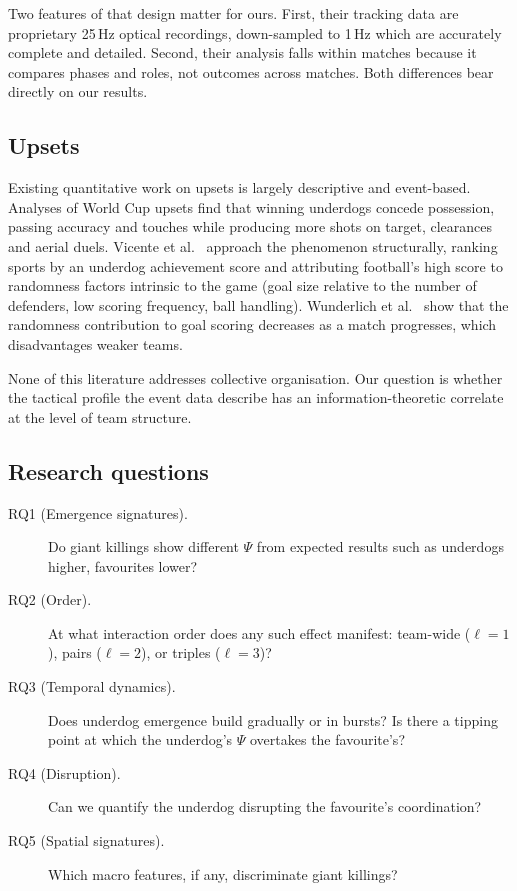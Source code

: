 \documentclass[11pt,a4paper]{article}
\begin{document}
Two features of that design matter for ours. First, their tracking data are proprietary
25\,Hz optical recordings, down-sampled to 1\,Hz which are accurately complete and detailed.
Second, their analysis falls within matches because it compares phases and roles, not outcomes across matches. 
Both differences bear directly on our results.

\subsection{Upsets}

Existing quantitative work on upsets is largely descriptive and event-based. Analyses of
World Cup upsets find that winning underdogs concede possession, passing accuracy and
touches while producing more shots on target, clearances and aerial duels.
Vicente et al.\
\cite{vicente2024} approach the phenomenon structurally, ranking sports by an underdog
achievement score and attributing football's high score to randomness factors intrinsic to
the game (goal size relative to the number of defenders, low scoring frequency, ball
handling). Wunderlich et al.\ \cite{wunderlich2021} show that the randomness contribution
to goal scoring decreases as a match progresses, which disadvantages weaker teams.

None of this literature addresses collective organisation. Our question is whether the
tactical profile the event data describe has an information-theoretic correlate at the
level of team structure.

\subsection{Research questions}

\begin{description}
\item[RQ1 (Emergence signatures).] Do giant killings show different $\Psi$ from expected
results such as underdogs higher, favourites lower?
\item[RQ2 (Order).] At what interaction order does any such effect manifest: team-wide
($\ell=1$), pairs ($\ell=2$), or triples ($\ell=3$)?
\item[RQ3 (Temporal dynamics).] Does underdog emergence build gradually or in bursts? Is
there a tipping point at which the underdog's $\Psi$ overtakes the favourite's?
\item[RQ4 (Disruption).] Can we quantify the underdog disrupting the favourite's
coordination?
\item[RQ5 (Spatial signatures).] Which macro features, if any, discriminate giant
killings?
\end{description}
\end{document}
